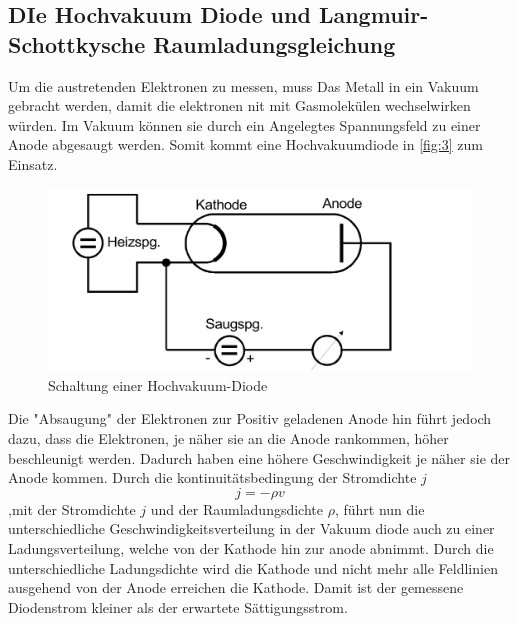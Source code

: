 \subsection{DIe Hochvakuum Diode und Langmuir-Schottkysche Raumladungsgleichung}
Um die austretenden Elektronen zu messen, muss Das Metall in ein Vakuum gebracht werden, damit die elektronen nit mit Gasmolekülen wechselwirken würden. 
Im Vakuum können sie durch ein Angelegtes Spannungsfeld zu einer Anode abgesaugt werden. Somit kommt eine Hochvakuumdiode in \autoref{fig:3}
zum Einsatz.
\begin{figure}[H]
    \centering
        \centering
        \includegraphics[width=\textwidth]{Bilder/schaltung.jpg}
        \caption{Schaltung einer Hochvakuum-Diode}
    \hfill
    \label{fig:3}
\end{figure}
Die "Absaugung" der Elektronen zur Positiv geladenen Anode hin führt jedoch dazu, dass die Elektronen, je näher sie an 
die Anode rankommen, höher beschleunigt werden. Dadurch haben eine höhere Geschwindigkeit je näher sie der Anode kommen. 
Durch die kontinuitätsbedingung der Stromdichte $j$ 
\begin{equation}
j = -\rho v
\end{equation}
,mit der Stromdichte $j$ und der Raumladungsdichte $\rho$, führt nun die unterschiedliche Geschwindigkeitsverteilung in der Vakuum diode 
auch zu einer Ladungsverteilung, welche von der Kathode hin zur anode abnimmt. Durch die unterschiedliche Ladungsdichte wird die Kathode und nicht mehr alle Feldlinien
 ausgehend von der Anode erreichen die Kathode. Damit ist der gemessene Diodenstrom kleiner als der erwartete Sättigungsstrom.

